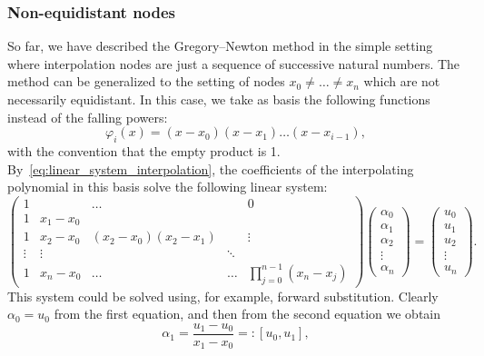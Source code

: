 \subsubsection*{Non-equidistant nodes}%
So far,
we have described the Gregory--Newton method in the simple setting where interpolation nodes are just a sequence of successive natural numbers.
The method can be generalized to the setting of nodes $x_0 \neq \dotsc \neq x_n$ which are not necessarily equidistant.
In this case, we take as basis the following functions instead of the falling powers:
\begin{equation}
    \label{eq:basis_newton}
    \varphi_{i}(x) = (x - x_0) (x - x_1) \dotsc (x - x_{i-1}),
\end{equation}
with the convention that the empty product is 1.
By~\eqref{eq:linear_system_interpolation},
the coefficients of the interpolating polynomial in this basis solve the following linear system:
\begin{equation}
    \label{eq:matrix_newton}
    \begin{pmatrix}
        1 &         & \ldots &        & 0  \\
        1 & x_1-x_0 &        &        &    \\
        1 & x_2-x_0 & (x_2-x_0)(x_2-x_1) &        & \vdots   \\
        \vdots & \vdots  &        & \ddots &    \\
        1 & x_n-x_0 & \ldots & \ldots & \prod_{j=0}^{n-1}(x_n - x_j)
    \end{pmatrix}
    \begin{pmatrix}
        \alpha_0 \\
        \alpha_1 \\
        \alpha_2 \\
        \vdots \\
        \alpha_n
    \end{pmatrix}
    =
    \begin{pmatrix}
        u_0 \\
        u_1 \\
        u_2 \\
        \vdots \\
        u_n
    \end{pmatrix}.
\end{equation}
This system could be solved using, for example, forward substitution.
Clearly $\alpha_0 = u_0$ from the first equation,
and then from the second equation we obtain
\[
    \alpha_1 = \frac{u_1 - u_0}{x_1 - x_0} =: [u_0, u_1],
\]
